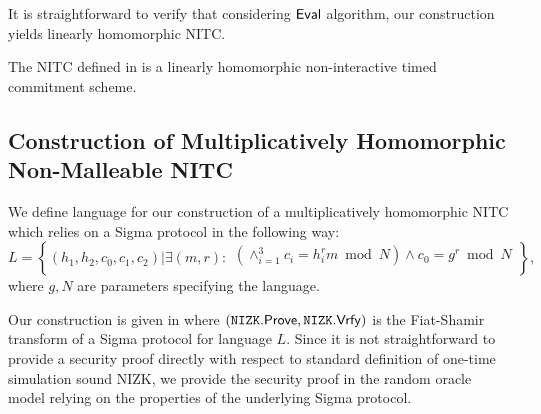 It is straightforward to verify that considering $\mathsf{Eval}$ algorithm, our construction yields linearly homomorphic NITC. 
\begin{theorem}\label{hom-lh-rom}
The NITC \mathlist{(\pgen, \com, \cvrfy, \dvrfy, \fdecom, \fdvrfy, \eval)} defined in  is a linearly homomorphic non-interactive timed commitment scheme.
\end{theorem}









\subsection{Construction of Multiplicatively Homomorphic Non-Malleable NITC}
\label{sec:mult-ROM}
We define language for our construction of a multiplicatively homomorphic NITC which relies on a Sigma protocol in the following way:
\[
L = \left\{(h_1, h_2, c_0, c_1, c_2)| \exists (m,r):
\begin{aligned}
       (\land_{i=1}^3 c_i = h_i^{r}m \bmod N) \land
       c_0 = g^r \bmod N\\
    \end{aligned}
    \right\}, 
\]
where $g, N$ are parameters specifying the language.

Our construction is given in  where $(\mathtt{NIZK}.\mathsf{Prove}, \mathtt{NIZK}.\mathsf{Vrfy})$ is the Fiat-Shamir transform of a Sigma protocol for language $L$. Since it is not straightforward to provide a security proof directly with respect to standard definition of one-time simulation sound NIZK, we provide the security proof in the random oracle model relying on the properties of the underlying Sigma protocol.



